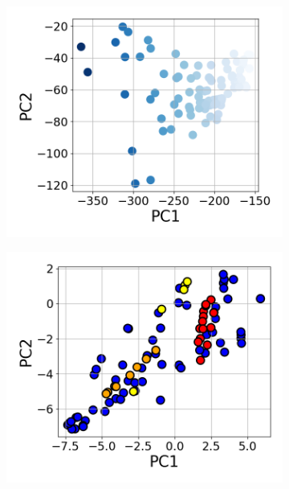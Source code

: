 \documentclass{article} %
\begin{document}
\begin{figure}[t]
\begin{subfigure}{0.182\textwidth}
    \includegraphics[width=\linewidth]{images/model-pca-components-entropy.png}
    \caption{}
\end{subfigure}\hfill
\begin{subfigure}{0.182\textwidth}
    \includegraphics[width=\linewidth]{images/model-tsne-components-no-entropy.png}
    \caption{}
\end{subfigure}\hfill
\begin{subfigure}{0.182\textwidth}

\end{subfigure}
\end{figure}
\end{document}
